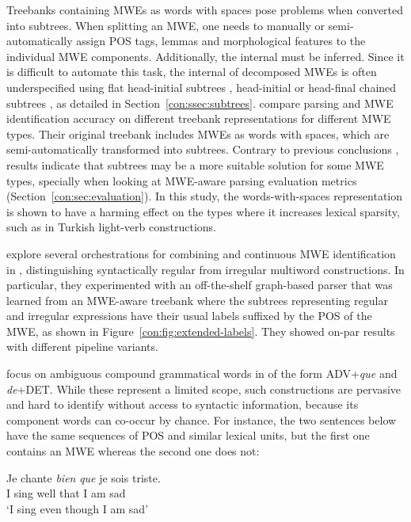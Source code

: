 \documentclass[output=paper]{langsci/langscibook}
\begin{document}
Treebanks containing MWEs as words with spaces pose problems when converted into subtrees. 
When splitting an MWE, one needs to manually or semi-automatically assign POS tags, lemmas and morphological features to the individual MWE components. 
Additionally, the internal  must be inferred.
Since it is difficult to automate this task, the internal  of decomposed MWEs is often underspecified using flat head-initial subtrees \citep{seddah13}, head-initial \citep{nivre16} or head-final chained subtrees \citep{eryigit:2011:multiword}, as detailed in Section~\ref{con:ssec:subtrees}.
\citet{eryigit:2011:multiword} compare parsing and MWE identification accuracy on different treebank representations for different MWE types.
Their original treebank includes MWEs as words with spaces, which are semi-automatically transformed into subtrees.
Contrary to previous conclusions \citep{nivre04b}, results indicate that subtrees may be a more suitable solution for some MWE types, specially when looking at MWE-aware parsing evaluation metrics (Section~\ref{con:sec:evaluation}). In this study, the words-with-spaces representation is shown to have a harming effect on the types where it increases lexical sparsity, such as in Turkish light-verb constructions.

\citet{candito2014strategies} explore several orchestrations for combining  and continuous MWE identification in , distinguishing syntactically regular from irregular multiword constructions. In particular, they experimented with an off-the-shelf graph-based parser that was learned from an MWE-aware treebank where the subtrees representing regular and irregular expressions have their usual labels suffixed by the POS of the MWE, as shown in Figure~\ref{con:fig:extended-labels}. They showed on-par results with different pipeline variants.


\citet{nasretal15} focus on ambiguous compound grammatical words in  of the form ADV+\textit{que} and \textit{de}+DET.
While these represent a limited scope, such constructions are pervasive and hard to identify without access to syntactic information, because its component words can co-occur by chance. %
For instance, the two sentences below have the same sequences of POS and similar lexical units, but the first one contains an MWE whereas the second one does not:

\ea
\gll Je chante {\textit{bien}} {\textit{que}}  je sois triste.\\  
     I  sing   well       that       I  am   sad\\
\glt `I sing even though I am sad'
\z 
\end{document}
